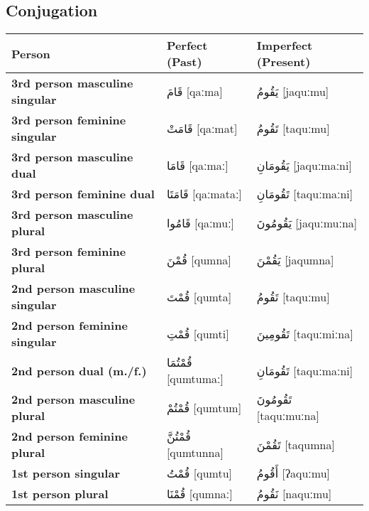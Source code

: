 \documentclass[letterpaper,12pt]{article}
\begin{document}
\subsection{Conjugation}
\begin{longtable}{|>{\raggedright}p{3.5cm}|p{5cm}|p{5cm}|}
\hline
\textbf{Person} & \textbf{Perfect (Past)} & \textbf{Imperfect (Present)} \\
\hline
\textbf{3rd person masculine singular} & \textarabic{قَامَ} [qaːma] & \textarabic{يَقُومُ} [jaquːmu] \\
\hline
\textbf{3rd person feminine singular} & \textarabic{قَامَتْ} [qaːmat] & \textarabic{تَقُومُ} [taquːmu] \\
\hline
\textbf{3rd person masculine dual} & \textarabic{قَامَا} [qaːmaː] & \textarabic{يَقُومَانِ} [jaquːmaːni] \\
\hline
\textbf{3rd person feminine dual} & \textarabic{قَامَتَا} [qaːmataː] & \textarabic{تَقُومَانِ} [taquːmaːni] \\
\hline
\textbf{3rd person masculine plural} & \textarabic{قَامُوا} [qaːmuː] & \textarabic{يَقُومُونَ} [jaquːmuːna] \\
\hline
\textbf{3rd person feminine plural} & \textarabic{قُمْنَ} [qumna] & \textarabic{يَقُمْنَ} [jaqumna] \\
\hline
\textbf{2nd person masculine singular} & \textarabic{قُمْتَ} [qumta] & \textarabic{تَقُومُ} [taquːmu] \\
\hline
\textbf{2nd person feminine singular} & \textarabic{قُمْتِ} [qumti] & \textarabic{تَقُومِينَ} [taquːmiːna] \\
\hline
\textbf{2nd person dual (m./f.)} & \textarabic{قُمْتُمَا} [qumtumaː] & \textarabic{تَقُومَانِ} [taquːmaːni] \\
\hline
\textbf{2nd person masculine plural} & \textarabic{قُمْتُمْ} [qumtum] & \textarabic{تَقُومُونَ} [taquːmuːna] \\
\hline
\textbf{2nd person feminine plural} & \textarabic{قُمْتُنَّ} [qumtunna] & \textarabic{تَقُمْنَ} [taqumna] \\
\hline
\textbf{1st person singular} & \textarabic{قُمْتُ} [qumtu] & \textarabic{أَقُومُ} [ʔaquːmu] \\
\hline
\textbf{1st person plural} & \textarabic{قُمْنَا} [qumnaː] & \textarabic{نَقُومُ} [naquːmu] \\
\hline
\end{longtable}
\end{document}

